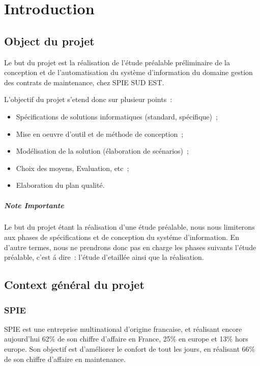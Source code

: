 \chapter{Introduction}

\section{Object du projet}

Le but du projet est la r\'ealisation de l’\'etude pr\'ealable pr\'eliminaire de la conception et de
l’automatisation du syst\`eme d’information du domaine gestion des contrats de maintenance, chez SPIE SUD EST.

L'objectif du projet s'etend donc sur plusieur points~:
\begin{itemize}
    \item Sp\'ecifications de solutions informatiques (standard, sp\'ecifique)~;
    \item Mise en oeuvre d’outil et de m\'ethode de conception~;
    \item Mod\'elisation de la solution (\'elaboration de sc\'enarios)~;
    \item Choix des moyens, Evaluation, etc~;
    \item Elaboration du plan qualit\'e.
\end{itemize}

\paragraph{Note Importante} Le but du projet \'etant la r\'ealisation  d'une \'etude pr\'ealable, nous nous
limiterons aux phases de sp\'ecifications et de conception du syst\'eme d’information. En d'autre termes,
nous ne prendrons donc pas en charge les phases suivants l’\'etude pr\'ealable, c’est \'a dire~:
l’\'etude d'etaill\'ee ainsi que la r\'ealisation.


\section{Context g\'en\'eral du projet}

\subsection{SPIE}

SPIE est une entreprise multinational d'origine francaise, et r\'ealisant encore aujourd'hui 62\% de son
chiffre d'affaire en France, 25\% en europe et 13\% hors europe. Son objectif est d'am\'eliorer le confort
de tout les jours, en r\'ealisant 66\% de son chiffre d'affaire en maintenance.

